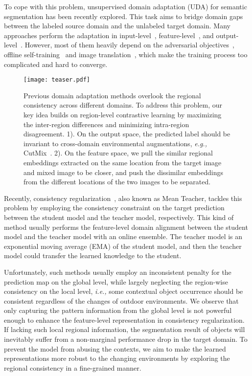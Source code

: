 \documentclass{article}
\begin{document}
To cope with this problem, unsupervised domain adaptation (UDA) for semantic segmentation has been recently explored.  This task aims to bridge domain gaps between the labeled source domain and the unlabeled target domain.
Many approaches perform the adaptation in input-level~\cite{BDL,LDR}, feature-level~\cite{FDA,CBST,CRST}, and output-level~\cite{AdaptSegNet,SIM,CLANv2}. 
However, most of them heavily depend on the adversarial objectives~\cite{AdaptSegNet,SIM,CLANv2}, offline self-training~\cite{BDL,DAST,CBST,CRST} and image translation~\cite{BDL,LDR}, which make the training process too complicated and hard to converge. 

\begin{figure}[t]

\centering
\texttt{[image: teaser.pdf]}
\caption{ Previous domain adaptation methods overlook the regional consistency across different domains. To address this problem,
our key idea builds on region-level contrastive learning  by maximizing the inter-region differences and  minimizing intra-region disagreement. 1). On the output space, the predicted label should be invariant to cross-domain environmental augmentations, \emph{e.g.,} CutMix~\cite{french2019semi}. 2). On the feature space, we pull the similar regional embeddings extracted on the same location from the target image and mixed image to be closer, and push the dissimilar embeddings from the different locations of the two images to be separated. }
\label{fig0}
\end{figure}

Recently, consistency regularization~\cite{choi2019self,tranheden2020dacs}, also known as Mean Teacher, tackles this problem by employing the consistency constraint on the target prediction between the student model and the teacher model, respectively.  This kind of method usually performs the feature-level domain alignment between the student model and the teacher model with an online ensemble. The teacher model is an exponential moving average (EMA) of the student model, and then the teacher model could transfer the learned knowledge to the student.


Unfortunately, such methods usually employ an inconsistent penalty for the prediction map on the global level, while largely neglecting the region-wise consistency on the local level, \emph{i.e.,} some contextual object occurrence should be consistent regardless of the changes of outdoor environments. We observe that only capturing the pattern information from the global level is not powerful enough to enhance the feature-level representation in consistency regularization. If lacking such local regional information,  the segmentation result of objects will inevitably suffer from a non-marginal performance drop in the target domain. To prevent the model from abusing the contexts, we aim to make the learned representations more robust to the changing environments by exploring the regional consistency in a fine-grained manner.
\end{document}
